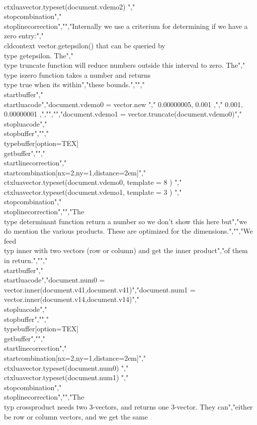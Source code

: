 {\\ctxlua{vector.typeset(document.vdemo2)}} {}","\\stopcombination","\\stoplinecorrection","","Internally we use a criterium for determining if we have a zero entry:","\\cldcontext {vector.getepsilon()} that can be queried by \\type {getepsilon}. The","\\type {truncate} function will reduce numbers outside this interval to zero. The","\\type {iszero} function takes a number and returns \\type {true} when its within","these bounds.","","\\startbuffer","\\startluacode","document.vdemo0 = vector.new {","    { 0.00000005, 0.001 },","    { 0.001, 0.00000001 },","}","","document.vdemo1 = vector.truncate(document.vdemo0)","\\stopluacode","\\stopbuffer","","\\typebuffer[option=TEX] \\getbuffer","","\\startlinecorrection","\\startcombination[nx=2,ny=1,distance=2em]","    {\\ctxlua{vector.typeset(document.vdemo0, { template = 8 } )}} {}","    {\\ctxlua{vector.typeset(document.vdemo1, { template = 3 } )}} {}","\\stopcombination","\\stoplinecorrection","","The \\type {determinant} function return a number so we don't show this here but","we do mention the various products. These are optimized for the dimensions.","","We feed \\typ {inner} with two vectors (row or column) and get the inner product","of them in return.","","\\startbuffer","\\startluacode","document.num0 = vector.inner(document.v41,document.v41)","document.num1 = vector.inner(document.v14,document.v14)","\\stopluacode","\\stopbuffer","","\\typebuffer[option=TEX] \\getbuffer","","\\startlinecorrection","\\startcombination[nx=2,ny=1,distance=2em]","    {\\ctxlua{vector.typeset(document.num0)}} {}","    {\\ctxlua{vector.typeset(document.num1)}} {}","\\stopcombination","\\stoplinecorrection","","The \\typ {crossproduct} needs two 3-vectors, and returns one 3-vector. They can","either be row or column vectors, and we get the same 